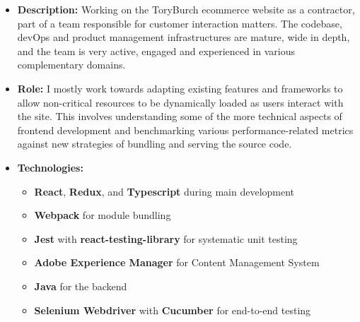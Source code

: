 \documentclass[10pt,a4paper,ragged2e,withhyper]{altacv}
\begin{document}


\makecvheader %



\begin{paracol}{2}


\begin{itemize}
\item \textbf{Description:} Working on the ToryBurch ecommerce website as a
contractor, part of a team responsible for customer interaction
matters. The codebase, devOps and product management
infrastructures are mature, wide in depth, and the team is very active,
engaged and experienced in various complementary domains.
\item \textbf{Role:} I mostly work towards adapting existing features and
frameworks to allow non-critical resources to be dynamically loaded
as users interact with the site. This involves understanding some of
the more technical aspects of frontend development and
benchmarking various performance-related metrics against new
strategies of bundling and serving the source code.
\item \textbf{Technologies:}
  \begin{itemize}
    \item \textbf{React}, \textbf{Redux}, and \textbf{Typescript} during main development
    \item \textbf{Webpack} for module bundling
    \item \textbf{Jest} with \textbf{react-testing-library} for systematic unit testing
    \item \textbf{Adobe Experience Manager} for Content Management System
    \item \textbf{Java} for the backend
    \item \textbf{Selenium Webdriver} with \textbf{Cucumber} for end-to-end testing
  \end{itemize}
\end{itemize}


\end{paracol}
\end{document}

